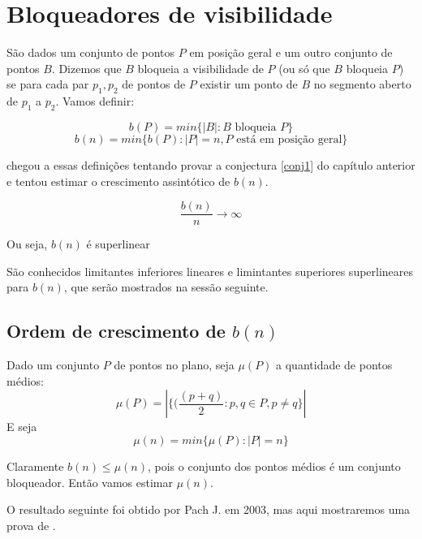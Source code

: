 \chapter{Bloqueadores de visibilidade}

São dados um conjunto de pontos $P$ em posição geral e um outro conjunto de pontos $B$. Dizemos que $B$ bloqueia a visibilidade de $P$ (ou só que $B$ bloqueia $P$) se para cada par $p_1,p_2$ de pontos de $P$ existir um ponto de $B$ no segmento aberto de $p_1$ a $p_2$. Vamos definir:

$$b(P) = min\{|B|:B\text{ bloqueia }P\}$$
$$b(n) = min\{b(P):|P|=n,P\text{ está em posição geral}\}$$

\cite{blockers} chegou a essas definições tentando provar a conjectura \ref{conj1} do capítulo anterior e tentou estimar o crescimento assintótico de $b(n)$.

\begin{conjectura}
    $$\frac{b(n)}{n}\rightarrow\infty$$

    Ou seja, $b(n)$ é superlinear
\end{conjectura}

São conhecidos limitantes inferiores lineares e limintantes superiores superlineares para $b(n)$, que serão mostrados na sessão seguinte.

\section{Ordem de crescimento de $b(n)$}

Dado um conjunto $P$ de pontos no plano, seja $\mu(P)$ a quantidade de pontos médios:
$$\mu(P)=|\{(\frac{(p+q)}{2}:p,q\in P, p\neq q\}|$$
E seja
$$\mu(n)=min\{\mu(P):|P|=n\}$$

Claramente $b(n)\leq \mu(n)$, pois o conjunto dos pontos médios é um conjunto bloqueador. Então vamos estimar $\mu(n)$.

O resultado seguinte foi obtido por Pach J. em 2003, mas aqui mostraremos uma prova de \cite{blockers}.

